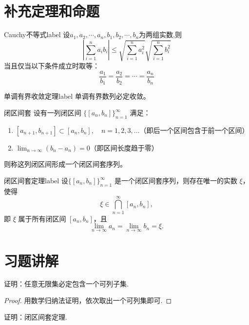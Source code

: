 \documentclass[lang=cn,12pt]{elegantbook}
\begin{document}
\section{补充定理和命题}

\begin{theorem}{Cauchy不等式}{label}
    设$a_1,a_2,\cdots,a_n,b_1,b_2,\cdots,b_n$为两组实数,则
    \[
    \left\lvert \sum_{i = 1}^na_ib_i\right\rvert \leq \sqrt{\sum_{i = 1}^n a_i^2} \sqrt{\sum_{i = 1}^n b_i^2}
    \]
    当且仅当以下条件成立时取等：
    \[
    \frac{a_1}{b_1} = \frac{a_2}{b_2} = \cdots = \frac{a_n}{b_n}
    \]
\end{theorem}

\begin{theorem}{单调有界收敛定理}{label}
    单调有界数列必定收敛。
\end{theorem}

\begin{definition}{闭区间套}
设有一列闭区间 $\{[a_n, b_n]\}_{n=1}^{\infty}$ 满足：
\begin{enumerate}
    \item $[a_{n+1}, b_{n+1}] \subset [a_n, b_n], \quad n=1,2,3,\ldots$（即后一个区间包含于前一个区间）
    \item $\lim_{n \to \infty} (b_n - a_n) = 0$（即区间长度趋于零）
\end{enumerate}
则称这列闭区间形成一个闭区间套序列。
\end{definition}

\begin{theorem}{闭区间套定理}{label}
设$\{[a_n, b_n]\}_{n=1}^{\infty}$ 是一个闭区间套序列，则存在唯一的实数 $\xi$，使得
\[
\xi \in \bigcap_{n=1}^{\infty} [a_n, b_n],
\]
即 $\xi$ 属于所有闭区间 $[a_n, b_n]$，且
\[
\lim_{n \to \infty} a_n = \lim_{n \to \infty} b_n = \xi.
\]
\end{theorem}

\section{习题讲解}

\begin{example}
    证明：任意无限集必定包含一个可列子集.
\end{example}
\begin{proof}
    用数学归纳法证明，依次取出一个可列集即可.
\end{proof}

\begin{example}
    证明：闭区间套定理.
\end{example}
\end{document}
